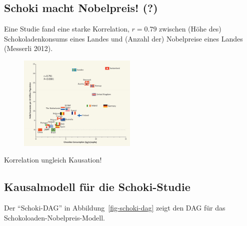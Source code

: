\documentclass[
  a4paper,
  DIV=11]{scrreprt}
\theoremstyle{definition}
\theoremstyle{remark}
\begin{document}
\hypertarget{schoki-macht-nobelpreis}{%
\subsection{Schoki macht Nobelpreis!
(?)}\label{schoki-macht-nobelpreis}}

Eine Studie fand eine starke Korrelation, \(r=0.79\) zwischen (Höhe des)
Schokoladenkonsums eines Landes und (Anzahl der) Nobelpreise eines
Landes (Messerli 2012).

\begin{figure}

{\centering \includegraphics[width=0.5\textwidth,height=\textheight]{./img/correlation_550.png}

}

\end{figure}

\begin{tcolorbox}[enhanced jigsaw, colframe=quarto-callout-important-color-frame, title=\textcolor{quarto-callout-important-color}{\faExclamation}\hspace{0.5em}{Wichtig}, breakable, leftrule=.75mm, coltitle=black, toptitle=1mm, bottomrule=.15mm, bottomtitle=1mm, opacityback=0, arc=.35mm, rightrule=.15mm, left=2mm, colbacktitle=quarto-callout-important-color!10!white, opacitybacktitle=0.6, toprule=.15mm, titlerule=0mm, colback=white]
Korrelation ungleich Kausation!
\end{tcolorbox}

\hypertarget{kausalmodell-fuxfcr-die-schoki-studie}{%
\subsection{Kausalmodell für die
Schoki-Studie}\label{kausalmodell-fuxfcr-die-schoki-studie}}

Der ``Schoki-DAG'' in Abbildung~\ref{fig-schoki-dag} zeigt den DAG für
das Schokoloaden-Nobelpreis-Modell.
\end{document}
